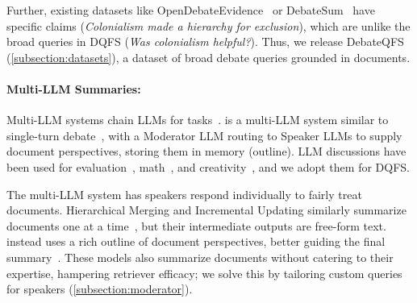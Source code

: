 Further, existing datasets like OpenDebateEvidence~\cite{roush2024opendebateevidence} or DebateSum~\cite{roush-balaji-2020-debatesum} have specific claims (\textit{Colonialism made a hierarchy for exclusion}), which are unlike the broad queries in DQFS (\textit{Was colonialism helpful?}).
Thus, we release DebateQFS (\cref{subsection:datasets}), a dataset of broad debate queries grounded in documents.

\paragraph{Multi-LLM Summaries:}

Multi-LLM systems chain LLMs for tasks~\cite{guo2024large}.
\model is a multi-LLM system similar to single-turn debate~\cite{parrish2022single}, with a Moderator LLM routing to Speaker LLMs to supply document perspectives, storing them in memory (outline).
LLM discussions have been used for evaluation~\cite{verga2024replacing}, math~\cite{sun2023query}, and creativity~\cite{lu2024llm}, and we adopt them for DQFS.

The multi-LLM \model system has speakers respond individually to fairly treat documents.
Hierarchical Merging and Incremental Updating similarly summarize documents one at a time~\cite{chang2024booookscore}, but their intermediate outputs are free-form text.
\model instead uses a rich outline of document perspectives, better guiding the final summary~\cite{shao2024assisting}.
These models also summarize documents without catering to their expertise, hampering retriever efficacy; we solve this by tailoring custom queries for speakers (\cref{subsection:moderator}).